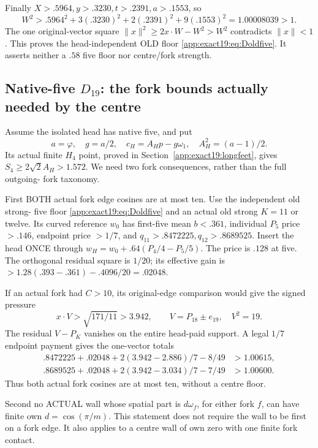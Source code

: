 \documentclass[11pt]{article}
\theoremstyle{definition}
\theoremstyle{remark}
\begin{document}
Finally
\(X>.5964,y>.3230,t>.2391,a>.1553\),
so
\[
 W^2>.5964^2+3(.3230)^2+2(.2391)^2+9(.1553)^2
                                 =1.00008039>1 .
\]
The one original-vector square
\(\|x\|^2\ge2x\cdot W-W^2>W^2\)
contradicts \(\|x\|<1\).
This proves the head-independent
OLD floor \eqref{app:exact19:eq:Doldfive}.
It asserts neither a \(.58\)
five floor nor centre/fork strength.


\subsection{Native-five \(D_{19}\): the fork bounds actually needed by the centre}
\label{app:exact19:Dfiveforkinputs}

Assume the isolated head has
native five, and put
\[
 a=\varphi,\quad g=a/2,\quad
 c_H=A_Hp-g\omega_1,\quad A_H^2=(a-1)/2 .
\]
Its actual finite \(H_4\) point,
proved in
Section~\ref{app:exact19:longfeet},
gives \(S_4\ge2\sqrt2A_H>1.572\).
We need two fork consequences,
rather than the full outgoing-
fork taxonomy.

First BOTH actual fork edge
cosines are at most ten.
Use the independent old strong-
five floor
\eqref{app:exact19:eq:Doldfive}
and an actual old strong
\(K=11\) or twelve.
Its curved reference \(w_0\)
has first-five mean \(b<.361\),
individual \(P_5\) price \(>.146\),
endpoint price \(>1/7\), and
\(q_{11}>.8472225,q_{12}>.8689525\).
Insert the head ONCE through
\(w_H=w_0+.64(P_4/4-P_5/5)\).
The price is \(.128\) at five.
The orthogonal residual square
is \(1/20\); its effective gain
is \(>1.28(.393-.361)-.4096/20=.02048\).

If an actual fork had \(C>10\),
its original-edge comparison would
give the signed pressure
\[
 x\cdot V>\sqrt{171/11}>3.942,\qquad
              V=P_{18}\pm e_{19},\quad V^2=19 .
\]
The residual \(V-P_K\) vanishes
on the entire head-paid support.
A legal \(1/7\) endpoint payment
gives the one-vector totals
\[
\begin{split}
 .8472225+.02048+2(3.942-2.886)/7-8/49&>1.00615,\\
 .8689525+.02048+2(3.942-3.034)/7-7/49&>1.00600 .
\end{split}
\]
Thus both actual fork cosines
are at most ten, without a
centre floor.

Second no ACTUAL wall whose
spatial part is \(d\omega_f\),
for either fork \(f\), can have
finite own \(d=\cos(\pi/m)\).
This statement does not require
the wall to be first on a fork
edge.
It also applies to a centre
wall of own zero with one
finite fork contact.
\end{document}
